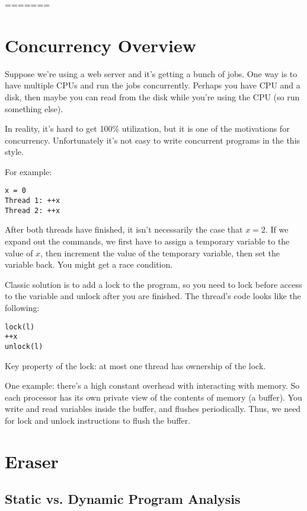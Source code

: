 \documentclass[psamsfonts]{amsart}
\begin{document}
=======
\maketitle

\section{Concurrency Overview}

Suppose we're using a web server and it's getting a bunch of jobs. One way is to have multiple CPUs and run the jobs concurrently. Perhaps you have CPU and a disk, then maybe you can read from the disk while you're using the CPU (so run something else).

In reality, it's hard to get 100\% utilization, but it is one of the motivations for concurrency. Unfortunately it's not easy to write concurrent programs in the this style.

For example:
\begin{verbatim}
x = 0
Thread 1: ++x
Thread 2: ++x
\end{verbatim}

After both threads have finished, it isn't necessarily the case that $x = 2$. If we expand out the commands, we first have to assign a temporary variable to the value of $x$, then increment the value of the temporary variable, then set the variable back. You might get a race condition.

Classic solution is to add a lock to the program, so you need to lock before access to the variable and unlock after you are finished. The thread's code looks like the following:
\begin{verbatim}
lock(l)
++x
unlock(l)
\end{verbatim}

Key property of the lock: at most one thread has ownership of the lock.

One example: there's a high constant overhead with interacting with memory. So each processor has its own private view of the contents of memory (a buffer). You write and read variables inside the buffer, and flushes periodically. Thus, we need for lock and unlock instructions to flush the buffer.

\section{Eraser}

\subsection{Static vs. Dynamic Program Analysis}
\end{document}

